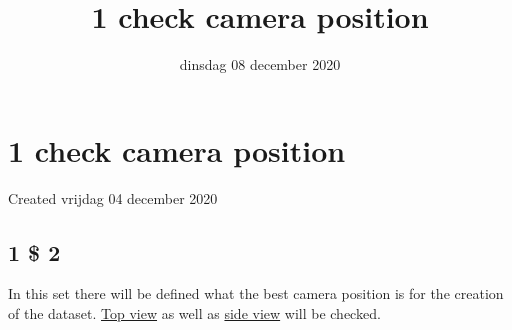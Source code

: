 \documentclass{scrartcl}
\title{1 check camera position}
\date{dinsdag 08 december 2020}
\author{}
\begin{document}
\maketitle

		\section{1 check camera position}

Created vrijdag 04 december 2020



\subsection{1 \$ 2}

In this set there will be defined what the best camera position is for the creation of the dataset. \href{./1_check_camera_position/1_camera_position_side.tex}{Top view} as well as \href{./1_check_camera_position/2_camera_position_top.tex}{side view} will be checked.
\end{document}

